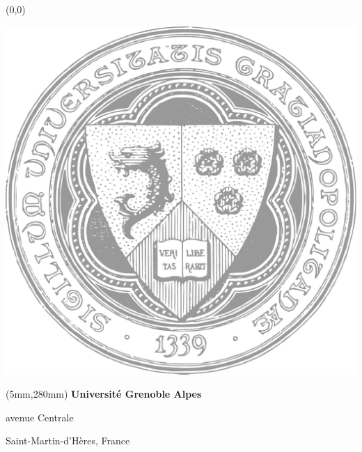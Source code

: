 \documentclass[a4paper, twoside]{report}
\begin{document}
\begin{textblock}{5}(0,0)
	\begin{center}
	    	\includegraphics[scale=0.30]{cover/uga_logo.pdf}
	\end{center}{}
	\vspace{300mm}
\end{textblock}

\begin{textblock*}{50mm}(5mm,280mm)
\color{uga_dark_gray}
{\bf\noindent Université Grenoble Alpes	         }

 avenue Centrale

 Saint-Martin-d'Hères, France 
\end{textblock*}
\end{document}
